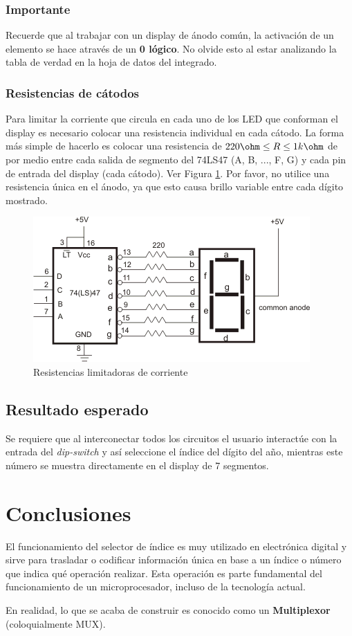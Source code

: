 \subsubsection*{Importante}
Recuerde que al trabajar con un display de ánodo común, la activación de un elemento se hace através de un \textbf{0 lógico}. No olvide esto
al estar analizando la tabla de verdad en la hoja de datos del integrado.

\subsubsection{Resistencias de cátodos}
Para limitar la corriente que circula en cada uno de los LED que conforman el display es necesario colocar una resistencia individual en cada cátodo.
La forma más simple de hacerlo es colocar una resistencia de $ 220 \ohm \leq R \leq 1 k\ohm$ de por medio entre cada salida de segmento del 74LS47 (A, B, ..., F, G)
y cada pin de entrada del display (cada cátodo). Ver Figura \ref{Fig:Currentlimitingresistors}. Por favor, no utilice una resistencia única en el ánodo, ya que esto causa brillo variable entre cada 
dígito mostrado.

\begin{figure}[H]
    \centering
    \includegraphics[scale=1.0]{images/DisplayResistors.png}
    \caption{Resistencias limitadoras de corriente}
    \label{Fig:Currentlimitingresistors}
\end{figure}


\subsection{Resultado esperado}
Se requiere que al interconectar todos los circuitos el usuario interactúe con la entrada del \emph{dip-switch} y así seleccione el índice del dígito del año, mientras
este número se muestra directamente en el display de 7 segmentos.

\section{Conclusiones}
El funcionamiento del selector de índice es muy utilizado en electrónica digital y sirve para trasladar o codificar información única
en base a un índice o número que indica qué operación realizar. Esta operación es parte fundamental del funcionamiento de un microprocesador,
incluso de la tecnología actual.

\vspace{14pt}

En realidad, lo que se acaba de construir es conocido como un \textbf{Multiplexor} (coloquialmente MUX).